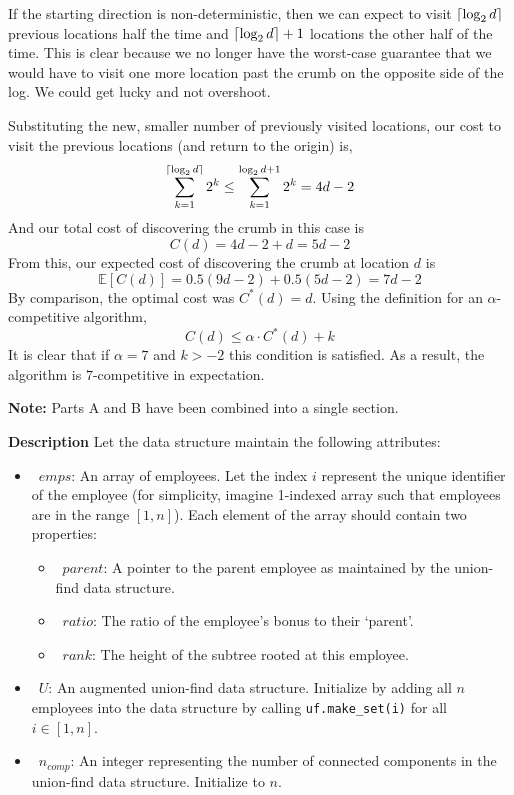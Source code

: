 \documentclass[12pt,twoside]{article}
\begin{document}
\begin{problems}
\begin{problemparts}
\problempart %

If the starting direction is non-deterministic, then we can expect to
visit $\left\lceil \log_2 d \right\rceil$ previous locations half the time and $\left\lceil \log_2 
d \right\rceil + 1$ locations the other half of the time. This is clear because we no
longer have the worst-case guarantee that we would have to visit one more
location past the crumb on the opposite side of the log. We could get 
lucky and not overshoot.

Substituting the new, smaller number of previously visited locations, our
cost to visit the previous locations (and return to the origin) is,
$$ \sum_{k = 1}^{\left\lceil \log_2 d \right\rceil} 2^k \leq \sum_{k = 1}^{\log_2 d + 1} 
2^k = 4d - 2 $$
And our total cost of discovering the crumb in this case is
$$ C(d) = 4d - 2 + d = 5d - 2 $$
From this, our expected cost of discovering the crumb at location $d$ is
$$ \mathbb{E}[C(d)] = 0.5 (9d - 2) + 0.5 (5d - 2) = 7d - 2 $$
By comparison, the optimal cost was $C^*(d) = d$. Using the definition for
an $\alpha$-competitive algorithm,
$$ C(d) \leq \alpha \cdot C^*(d) + k $$
It is clear that if $\alpha = 7$ and $k > -2$ this condition is satisfied.
As a result, the algorithm is $7$-competitive in expectation.

\end{problemparts}

\newpage
\problem  %

\textbf{Note:} Parts A and B have been combined into a single section.

\textbf{Description} Let the data structure maintain the following attributes:

\begin{itemize}
    \item\ $emps$: An array of employees. Let the index $i$ represent the
        unique identifier of the employee (for simplicity, imagine 1-indexed
        array such that employees are in the range $[1, n]$). Each element of 
        the array should contain two properties:
        \begin{itemize}
            \item\ $parent$: A pointer to the parent employee as maintained
                by the union-find data structure.
            \item\ $ratio$: The ratio of the employee's bonus to their 
                `parent'.
            \item\ $rank$: The height of the subtree rooted at this
                employee.
        \end{itemize}
    \item\ $U$: An augmented union-find data structure. Initialize by 
        adding all $n$ employees into the data structure by calling 
        \texttt{uf.make\_set(i)} for all $i \in [1, n]$.
    \item\ $n_{comp}$: An integer representing the number of connected
        components in the union-find data structure. Initialize to $n$.
\end{itemize}


\end{problems}
\end{document}
